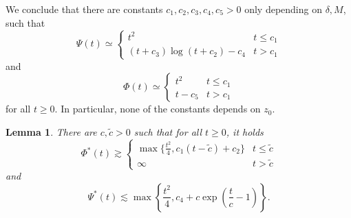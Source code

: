 \documentclass[a4paper,11pt]{amsart}
\numberwithin{equation}{section}
\newtheorem{lemma}[defi]{Lemma}
\begin{document}
	We conclude that there are constants $c_1, c_2, c_3, c_4, c_5 > 0$ only depending on $\delta,M$, such that \[
	\Psi(t) \simeq \begin{cases}
		t^2 & t \leq c_1 \\
		(t+c_3) \log(t+c_2)-c_4 & t > c_1
	\end{cases}
	\]
	and \[
	\Phi(t) \simeq \begin{cases}
		t^2 & t \leq c_1 \\
		t - c_5 & t > c_1
	\end{cases}
	\]
	for all $t \geq 0$. In particular, none of the constants depends on $z_0$.
	\begin{lemma} \label{lem:abschätz_phi_psi}
		There are $c,\tilde{c} > 0$ such that for all $t \geq 0$, it holds \[
		\Phi^*(t) \gtrsim \begin{cases}
			\max \{\frac{t^2}{4}, c_1(t-\tilde{c})+c_2 \} & t \leq \tilde{c} \\
			\infty & t > \tilde{c}
		\end{cases}
		\]
		and \[
		\Psi^*(t) \lesssim \max \left\{ \frac{t^2}{4}, c_4 + c\exp \left(\frac{t}{c}-1 \right) \right\}.
		\]
	\end{lemma}
	
\end{document}
